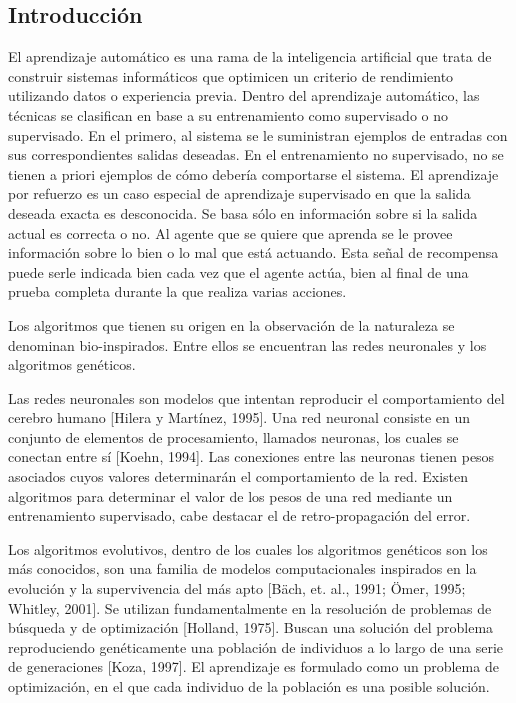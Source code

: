 \documentclass[11pt]{article}
\begin{document}
\begin{titlepage}
\begin{abstract}
\end{abstract}

\newpage

\tableofcontents

\newpage

\section{Introducci\'on}
\label{sec-1}

  \label{intro}

 El aprendizaje autom\'atico es una rama de la inteligencia artificial que trata de construir sistemas inform\'aticos que optimicen un criterio de rendimiento utilizando datos o experiencia previa. Dentro del aprendizaje autom\'atico, las t\'ecnicas se clasifican en base a su entrenamiento como supervisado o no supervisado. En el primero, al sistema se le suministran ejemplos de entradas con sus correspondientes salidas deseadas. En el entrenamiento no supervisado, no se tienen a priori ejemplos de c\'omo deber\'ia comportarse el sistema. El aprendizaje por refuerzo es un caso especial de aprendizaje supervisado en que la salida deseada exacta es desconocida. Se basa s\'olo en informaci\'on sobre si la salida actual es correcta o no. Al agente que se quiere que aprenda se le provee informaci\'on sobre lo bien o lo mal que est\'a actuando. Esta se\~nal de recompensa puede serle indicada bien cada vez que el agente act\'ua, bien al final de una prueba completa durante la que realiza varias acciones.

 Los algoritmos que tienen su origen en la observaci\'on de la naturaleza se denominan bio-inspirados. Entre ellos se encuentran las redes neuronales y los algoritmos gen\'eticos. 

 Las redes neuronales son modelos que intentan reproducir el comportamiento del cerebro humano [Hilera y Mart\'inez, 1995]. Una red neuronal consiste en un conjunto de elementos de procesamiento, llamados neuronas, los cuales se conectan entre s\'i [Koehn, 1994]. Las conexiones entre las neuronas tienen pesos asociados cuyos valores determinar\'an el comportamiento de la red. Existen algoritmos para determinar el valor de los pesos de una red mediante un entrenamiento supervisado, cabe destacar el de retro-propagaci\'on del error.

 Los algoritmos evolutivos, dentro de los cuales los algoritmos gen\'eticos son los m\'as conocidos, son una familia de modelos computacionales inspirados en la evoluci\'on y la supervivencia del m\'as apto [B\"ach, et. al., 1991; \"Omer, 1995; Whitley, 2001]. Se utilizan fundamentalmente en la resoluci\'on de problemas de b\'usqueda y de optimizaci\'on [Holland, 1975]. Buscan una soluci\'on del problema reproduciendo gen\'eticamente una poblaci\'on de individuos a lo largo de una serie de generaciones [Koza, 1997]. El aprendizaje es formulado como un problema de optimizaci\'on, en el que cada individuo de la poblaci\'on es una posible soluci\'on.


\end{titlepage}
\end{document}
